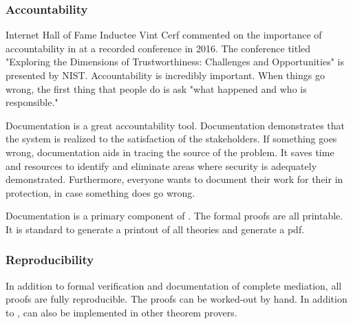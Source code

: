 \documentclass[../../main/main.tex]{subfiles}
\begin{document}
\subsubsection{Accountability}\label{ssec:accountability}
Internet Hall of Fame Inductee Vint Cerf commented on the importance of accountability in  at a recorded conference in 2016.  The conference titled "Exploring the Dimensions of Trustworthiness: Challenges and Opportunities" is presented by NIST.  Accountability is incredibly important.  When things go wrong, the first thing that people do is ask "what happened and who is responsible."


Documentation is a great accountability tool.  Documentation demonstrates that the system is realized to the satisfaction of the stakeholders. If something goes wrong, documentation aids in tracing the source of the problem. It saves time and resources to identify and eliminate areas where security is adequately demonstrated.   Furthermore, everyone wants to document their work for their in protection, in case something does go wrong.  

Documentation is a primary component of .  The  formal proofs are all printable. It is standard to generate a printout of all theories and generate a pdf.  

\subsubsection{Reproducibility}\label{ssec:reproducibility}
In addition to formal verification and documentation of complete mediation, all proofs are fully reproducible.  The  proofs can be worked-out by hand.  In addition to ,  can also be implemented in other theorem provers. 
\end{document}
